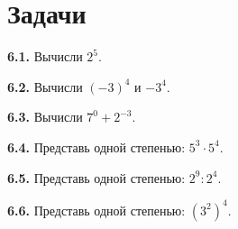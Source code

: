 \section*{Задачи}
\begingroup\setlength{\parskip}{2pt}
\noindent\begin{minipage}[t]{\linewidth}\textbf{6.1.} Вычисли \(2^{5}\).\par\end{minipage}\par
\noindent\begin{minipage}[t]{\linewidth}\textbf{6.2.} Вычисли \((- 3)^{4}\) и \(- 3^{4}\).\par\end{minipage}\par
\noindent\begin{minipage}[t]{\linewidth}\textbf{6.3.} Вычисли \(7^{0} + 2^{- 3}\).\par\end{minipage}\par
\noindent\begin{minipage}[t]{\linewidth}\textbf{6.4.} Представь одной степенью: \(5^{3} \cdot  5^{4}\).\par\end{minipage}\par
\noindent\begin{minipage}[t]{\linewidth}\textbf{6.5.} Представь одной степенью: \(2^{9} : 2^{4}\).\par\end{minipage}\par
\noindent\begin{minipage}[t]{\linewidth}\textbf{6.6.} Представь одной степенью: \((3^{2})^{4}\).\par\end{minipage}\par
